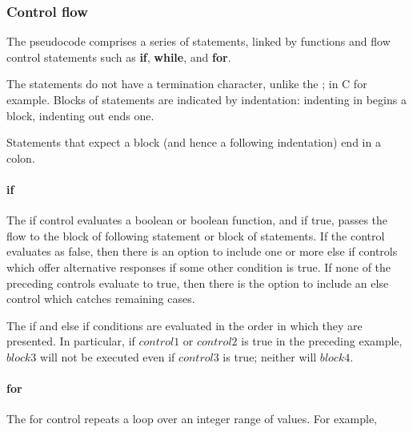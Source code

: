 \subsubsection{Control flow}
\label{controlflow}

The pseudocode comprises a series of statements, linked by functions and
flow control statements such as {\bf if}, {\bf while}, and {\bf for}.

The statements do not have a termination character, unlike the ; in C
for example.  Blocks of statements are indicated by indentation:
indenting in begins a block, indenting out ends one.

Statements that expect a block (and hence a following indentation) end
in a colon.

\paragraph*{if}

The if control evaluates a boolean or boolean function, and if true, passes the 
flow to the block of following statement or block of statements. If the control
evaluates as false, then there is an option to include one or more else if
controls which offer alternative responses if some other condition is
true.  If none of the preceding controls evaluate to true, then there is
the option to include an else control which catches remaining cases.

\begin{pseudo*}
\bsELSE
\bsEND
\end{pseudo*}

The if and else if conditions are evaluated in the order in which they
are presented. In particular, if $control1$ or $control2$ is true in
the preceding example, $block3$ will not be executed
even if $control3$ is true; neither will $block4$.

\paragraph*{for}

The for control repeats a loop over an integer range of values. For example,

\begin{pseudo*}
\bsEND
\end{pseudo*}

